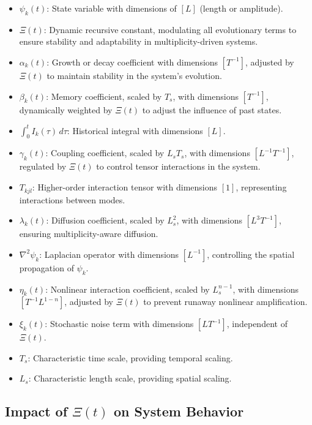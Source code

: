 \documentclass{article}
\theoremstyle{plain}
\begin{document}
\begin{itemize}
    \item \( \psi_k(t) \): State variable with dimensions of \( [L] \) (length or amplitude).
    \item \(\Xi(t) \): Dynamic recursive constant, modulating all evolutionary terms to ensure stability and adaptability in multiplicity-driven systems.
    \item \( \alpha_k(t) \): Growth or decay coefficient with dimensions \( [T^{-1}] \), adjusted by \(\Xi(t) \) to maintain stability in the system's evolution.
    \item \( \beta_k(t) \): Memory coefficient, scaled by \( T_s \), with dimensions \( [T^{-1}] \), dynamically weighted by \(\Xi(t) \) to adjust the influence of past states.
    \item \( \int_0^t I_k(\tau) \, d\tau \): Historical integral with dimensions \( [L] \).
    \item \( \gamma_k(t) \): Coupling coefficient, scaled by \( L_s T_s \), with dimensions \( [L^{-1} T^{-1}] \), regulated by \(\Xi(t) \) to control tensor interactions in the system.
    \item \( T_{kjl} \): Higher-order interaction tensor with dimensions \( [1] \), representing interactions between modes.
    \item \( \lambda_k(t) \): Diffusion coefficient, scaled by \( L_s^2 \), with dimensions \( [L^3 T^{-1}] \), ensuring multiplicity-aware diffusion.
    \item \( \nabla^2 \psi_k \): Laplacian operator with dimensions \( [L^{-1}] \), controlling the spatial propagation of \( \psi_k \).
    \item \( \eta_k(t) \): Nonlinear interaction coefficient, scaled by \( L_s^{n-1} \), with dimensions \( [T^{-1} L^{1-n}] \), adjusted by \(\Xi(t) \) to prevent runaway nonlinear amplification.
    \item \( \xi_k(t) \): Stochastic noise term with dimensions \( [L T^{-1}] \), independent of \(\Xi(t) \).
    \item \( T_s \): Characteristic time scale, providing temporal scaling.
    \item \( L_s \): Characteristic length scale, providing spatial scaling.
\end{itemize}

\subsection{Impact of \(\Xi(t) \) on System Behavior}
\end{document}
